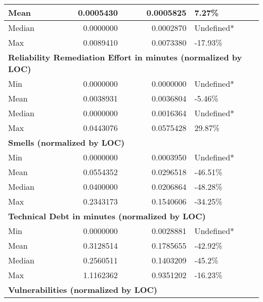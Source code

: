 \begin{table}
\begin{tabular}[t]{l|r|r|l}
\hline
\hspace{1em}Mean & 0.0005430 & 0.0005825 & 7.27\%\\
\hline
\hspace{1em}Median & 0.0000000 & 0.0002870 & Undefined*\\
\hline
\hspace{1em}Max & 0.0089410 & 0.0073380 & -17.93\%\\
\hline
\multicolumn{4}{l}{\textbf{Reliability Remediation Effort in minutes (normalized by LOC)}}\\
\hline
\hspace{1em}Min & 0.0000000 & 0.0000000 & \vphantom{1} Undefined*\\
\hline
\hspace{1em}Mean & 0.0038931 & 0.0036804 & -5.46\%\\
\hline
\hspace{1em}Median & 0.0000000 & 0.0016364 & Undefined*\\
\hline
\hspace{1em}Max & 0.0443076 & 0.0575428 & 29.87\%\\
\hline
\multicolumn{4}{l}{\textbf{Smells (normalized by LOC)}}\\
\hline
\hspace{1em}Min & 0.0000000 & 0.0003950 & Undefined*\\
\hline
\hspace{1em}Mean & 0.0554352 & 0.0296518 & -46.51\%\\
\hline
\hspace{1em}Median & 0.0400000 & 0.0206864 & -48.28\%\\
\hline
\hspace{1em}Max & 0.2343173 & 0.1540606 & -34.25\%\\
\hline
\multicolumn{4}{l}{\textbf{Technical Debt in minutes (normalized by LOC)}}\\
\hline
\hspace{1em}Min & 0.0000000 & 0.0028881 & Undefined*\\
\hline
\hspace{1em}Mean & 0.3128514 & 0.1785655 & -42.92\%\\
\hline
\hspace{1em}Median & 0.2560511 & 0.1403209 & -45.2\%\\
\hline
\hspace{1em}Max & 1.1162362 & 0.9351202 & -16.23\%\\
\hline
\multicolumn{4}{l}{\textbf{Vulnerabilities (normalized by LOC)}}\\

\end{tabular}
\end{table}
